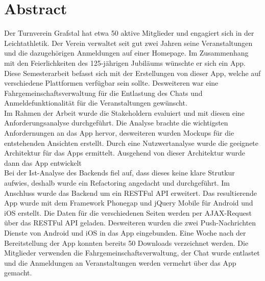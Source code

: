 %
%

\thispagestyle{empty}



\newpage
\thispagestyle{empty}
\chapter*{Abstract}\label{abstract}
Der Turnverein Grafstal hat etwa 50 aktive Mitglieder und engagiert sich in der Leichtathletik. Der Verein verwaltet seit gut zwei Jahren seine Veranstaltungen und die dazugehörigen Anmeldungen auf einer Homepage. Im Zusammenhang mit den Feierlichkeiten des 125-jährigen Jubiläums wünschte er sich ein App.\\

Diese Semesterarbeit befasst sich mit der Erstellungen von dieser App, welche auf verschiedene Plattformen verfügbar sein sollte. Desweiteren war eine Fahrgemeinschaftsverwaltung für die Entlastung des Chats und Anmeldefunktionalität für die Veranstaltungen gewünscht.\\

Im Rahmen der Arbeit wurde die Stakeholdern evaluiert und mit diesen eine Anforderungsanalyse durchgeführt. Die Analyse brachte die wichtigsten Anfordernungen an das App hervor, desweiteren wurden Mockups für die entstehenden Ansichten erstellt. Durch eine Nutzwertanalyse wurde die geeignete Architektur für das Apps ermittelt. Ausgehend von dieser Architektur wurde dann das App entwickelt\\

Bei der Ist-Analyse des Backends fiel auf, dass dieses keine klare Strutkur aufwies, deshalb wurde ein Refactoring angedacht und durchgeführt. Im Anschluss wurde das Backend um ein RESTFul API erweitert. Das resultierende App wurde mit dem Framework Phonegap und jQuery Mobile für Android und iOS erstellt. Die Daten für die verschiedenen Seiten werden per AJAX-Request über das RESTFul API geladen. Desweiteren wurden die zwei Push-Nachrichten Dienste von Android und iOS in das App eingebunden. Eine Woche nach der Bereitstellung der App konnten bereits 50 Downloads verzeichnet werden. Die Mitglieder verwenden die Fahrgemeinschaftsverwaltung, der Chat wurde entlastet und die Anmeldungen an Veranstaltungen werden vermehrt über das App gemacht.

